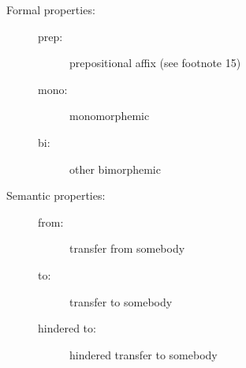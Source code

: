 \documentclass[output=paper]{langscibook}
\begin{document}
\label{falk:appendix:2}
\begin{description}
     \item[Formal properties:] 
       \begin{description}
          \item[]
          \item[prep:] prepositional affix (see footnote 15)
          \item[mono:] monomorphemic
          \item[bi:] other bimorphemic 
       \end{description}
     \item[Semantic properties:]
     \begin{description}
          \item[]
          \item[from:] transfer from somebody
          \item[to:] transfer to somebody
          \item[hindered to:] hindered transfer to somebody
      \end{description}
\end{description}
\end{document}
